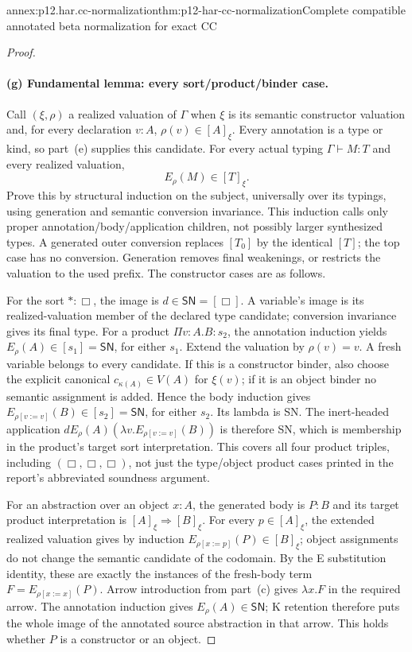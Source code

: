 \begin{annexitem}{annex:p12.har.cc-normalization}{thm:p12-har-cc-normalization}{Complete compatible annotated beta normalization for exact CC}
\begin{proof}
\paragraph{(g) Fundamental lemma: every sort/product/binder case.}
Call \((\xi,\rho)\) a realized valuation of \(\Gamma\) when
\(\xi\) is its semantic constructor valuation and, for every
declaration \(v:A\), \(\rho(v)\in[A]_\xi\). Every annotation is
a type or kind, so part~(e) supplies this candidate. For every actual typing
\(\Gamma\vdash M:T\) and every realized valuation,
\[
                         E_\rho(M)\in[T]_\xi.
\]
Prove this by structural induction on the subject, universally over its
typings, using generation and semantic conversion invariance. This
induction calls only proper annotation/body/application children, not
possibly larger synthesized types. A generated outer conversion replaces
\([T_0]\) by the identical \([T]\); the top case has no conversion.
Generation removes final weakenings, or restricts the valuation to the
used prefix. The constructor cases are as follows.

For the sort \(\ast:\Box\), the image is \(d\in\mathsf{SN}
=[\Box]\). A variable's image is its realized-valuation member of
the declared type candidate; conversion invariance gives its final type.
For a product \(\Pi v:A.B:s_2\), the annotation induction yields
\(E_\rho(A)\in[s_1]=\mathsf{SN}\), for either \(s_1\).
Extend the valuation by \(\rho(v)=v\). A fresh variable belongs to
every candidate. If this is a constructor binder, also choose the explicit
canonical \(c_{\kappa(A)}\in V(A)\) for \(\xi(v)\); if it is an
object binder no semantic assignment is added. Hence the body induction
gives \(E_{\rho[v:=v]}(B)\in[s_2]=\mathsf{SN}\), for either
\(s_2\). Its lambda is SN. The inert-headed application
\(dE_\rho(A)(\lambda v.E_{\rho[v:=v]}(B))\) is therefore SN,
which is membership in the product's target sort interpretation.
This covers all four product triples, including \((\Box,\Box,\Box)\),
not just the type/object product cases printed in the report's abbreviated
soundness argument.

For an abstraction over an object \(x:A\), the generated body is
\(P:B\) and its target product interpretation is
\([A]_\xi\Rightarrow[B]_\xi\). For every \(p\in[A]_\xi\),
the extended realized valuation gives by induction
\(E_{\rho[x:=p]}(P)\in[B]_\xi\); object assignments do not change
the semantic candidate of the codomain. By the E substitution identity,
these are exactly the instances of the fresh-body term
\(F=E_{\rho[x:=x]}(P)\). Arrow introduction from part~(c) gives
\(\lambda x.F\) in the required arrow. The annotation induction
gives \(E_\rho(A)\in\mathsf{SN}\); K retention therefore puts
the whole image of the annotated source abstraction in that arrow.
This holds whether \(P\) is a constructor or an object.


\end{proof}
\end{annexitem}
